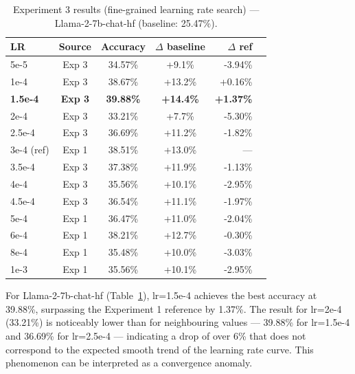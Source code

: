   \begin{table}[ht]
  \caption{Experiment 3 results (fine-grained learning rate search) --- Llama-2-7b-chat-hf (baseline: 25.47\%).}
  \centering
  \footnotesize
  \begin{tabular}{lcccrr}
  \toprule
  \textbf{LR} & \textbf{Source} & \textbf{Accuracy} & \textbf{$\Delta$ baseline} & \textbf{$\Delta$ ref} \\
  \midrule
  5e-5   & Exp 3 & 34.57\% & +9.1\%  & -3.94\% \\
  1e-4   & Exp 3 & 38.67\% & +13.2\% & +0.16\% \\
  \textbf{1.5e-4} & \textbf{Exp 3} & \textbf{39.88\%} & \textbf{+14.4\%} & \textbf{+1.37\%} \\
  2e-4   & Exp 3 & 33.21\% & +7.7\%  & -5.30\% \\
  2.5e-4 & Exp 3 & 36.69\% & +11.2\% & -1.82\% \\
  3e-4 (ref) & Exp 1 & 38.51\% & +13.0\% & --- \\
  3.5e-4 & Exp 3 & 37.38\% & +11.9\% & -1.13\% \\
  4e-4   & Exp 3 & 35.56\% & +10.1\% & -2.95\% \\
  4.5e-4 & Exp 3 & 36.54\% & +11.1\% & -1.97\% \\
  5e-4   & Exp 1 & 36.47\% & +11.0\% & -2.04\% \\
  6e-4   & Exp 1 & 38.21\% & +12.7\% & -0.30\% \\
  8e-4   & Exp 1 & 35.48\% & +10.0\% & -3.03\% \\
  1e-3   & Exp 1 & 35.56\% & +10.1\% & -2.95\% \\
  \bottomrule
  \end{tabular}

  \label{tab:exp3-llama-chat}
  \end{table}

  For Llama-2-7b-chat-hf (Table~\ref{tab:exp3-llama-chat}),
  lr=1.5e-4 achieves the best accuracy at 39.88\%,
  surpassing the Experiment 1 reference by 1.37\%.
  The result for lr=2e-4 (33.21\%) is noticeably
  lower than for neighbouring values --- 39.88\%
  for lr=1.5e-4 and 36.69\% for lr=2.5e-4 ---
  indicating a drop of over 6\% that does not
  correspond to the expected smooth trend of the
  learning rate curve. This phenomenon can be
  interpreted as a convergence anomaly.

